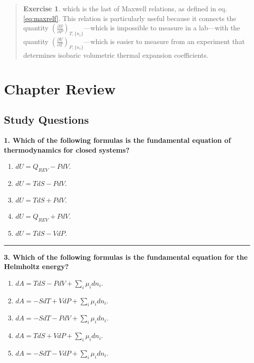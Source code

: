 \documentclass[
  9pt,
]{extbook}
\providecommand{\tightlist}{%
  \setlength{\itemsep}{0pt}\setlength{\parskip}{0pt}}
\theoremstyle{definition}
\theoremstyle{definition}
\theoremstyle{definition}
\newtheorem{exercise}{Exercise}[chapter]
\theoremstyle{definition}
\theoremstyle{remark}
\begin{document}
\begin{quote}
\begin{exercise}
which is the last of Maxwell relations, as defined in eq. \eqref{eq:maxrelf}. This relation is particularly useful because it connects the quantity \(\left(\frac{\partial S}{\partial P} \right)_{T,\{n_i\}}\)---which is impossible to measure in a lab---with the quantity \(\left(\frac{\partial V}{\partial T} \right)_{P,\{n_i\}}\)---which is easier to measure from an experiment that determines isobaric volumetric thermal expansion coefficients.
\end{exercise}
\end{quote}

\section{Chapter Review}\label{rev8}

\subsection{Study Questions}\label{quest8}

\textbf{1. Which of the following formulas is the fundamental equation of thermodynamics for closed systems?}

\begin{enumerate}
\def\labelenumi{\alph{enumi}.}
\tightlist
\item
  \(dU = Q_{REV} - PdV\).
\item
  \(dU = TdS - PdV\).
\item
  \(dU = TdS + PdV\).
\item
  \(dU = Q_{REV} + PdV\).
\item
  \(dU = TdS - VdP\).
\end{enumerate}

\begin{center}\rule{0.5\linewidth}{0.5pt}\end{center}

\textbf{3. Which of the following formulas is the fundamental equation for the Helmholtz energy?}

\begin{enumerate}
\def\labelenumi{\alph{enumi}.}
\tightlist
\item
  \(dA = TdS - PdV + \sum_i \mu_i dn_i\).
\item
  \(dA = -SdT + VdP + \sum_i \mu_i dn_i\).
\item
  \(dA = -SdT - PdV + \sum_i \mu_i dn_i\).
\item
  \(dA = TdS + VdP + \sum_i \mu_i dn_i\).
\item
  \(dA = -SdT - VdP + \sum_i \mu_i dn_i\).
\end{enumerate}
\end{document}
